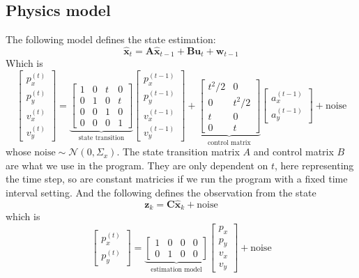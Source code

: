 \documentclass[12pt]{article}
\begin{document}
	\subsection{Physics model}\label{sub:model}
	The following model defines the state estimation:
	\begin{equation}
		\hat{\mathbf{x}}_t=\mathbf{A}\hat{\mathbf{x}}_{t-1}+\mathbf{B}\mathbf{u}_t+\mathbf{w}_{t-1}
	\end{equation}
	Which is
	\begin{equation}
		\begin{bmatrix}
			p^{(t)}_x \\ p^{(t)}_y \\ v^{(t)}_x \\ v^{(t)}_y
		\end{bmatrix}=
		\underbrace{\begin{bmatrix}
			1 & 0 & t & 0 \\
			0 & 1 & 0 & t \\
			0 & 0 & 1 & 0 \\
			0 & 0 & 0 & 1
		\end{bmatrix}}_{\text{state transition}}
		\begin{bmatrix}
			p^{(t-1)}_x \\ p^{(t-1)}_y \\ v^{(t-1)}_x \\ v^{(t-1)}_y
		\end{bmatrix}+
		\underbrace{\begin{bmatrix}
			t^2/2 & 0 \\
			0 & t^2/2 \\
			t & 0 \\
			0 & t
		\end{bmatrix}}_{\text{control matrix}}
		\begin{bmatrix}
			a^{(t-1)}_x \\ a^{(t-1)}_y
		\end{bmatrix}+\text{noise}
	\end{equation}
	whose $\text{noise}\sim\mathcal{N}\left(0,\Sigma_x\right)$. The state transition matrix $A$ and control matrix $B$ are what we use in the program. They are only dependent on $t$, here representing the time step, so are constant matricies if we run the program with a fixed time interval setting. And the following defines the observation from the state
	\begin{equation}
		\mathbf{z}_k=\mathbf{C}\hat{\mathbf{x}}_k+\text{noise}
	\end{equation}
	which is
	\begin{equation}
		\begin{bmatrix}
			p^{(t)}_x \\ p^{(t)}_y
		\end{bmatrix}=
		\underbrace{\begin{bmatrix}
			1 & 0 & 0 & 0 \\
			0 & 1 & 0 & 0
		\end{bmatrix}}_{\text{estimation model}}
		\begin{bmatrix}
			p_x \\ p_y \\ v_x \\ v_y
		\end{bmatrix}+\text{noise}
	\end{equation}
\end{document}
